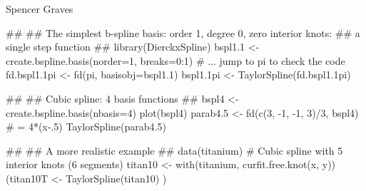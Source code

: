 \documentclass{article}
\begin{document}
\begin{Author}\relax
Spencer Graves
\end{Author}
\begin{SeeAlso}\relax
{}
\end{SeeAlso}
\begin{Examples}
\begin{ExampleCode}
##
## The simplest b-spline basis:  order 1, degree 0, zero interior knots:
##       a single step function
##
library(DierckxSpline)
bspl1.1 <- create.bspline.basis(norder=1, breaks=0:1)
# ... jump to pi to check the code
fd.bspl1.1pi <- fd(pi, basisobj=bspl1.1)
bspl1.1pi <- TaylorSpline(fd.bspl1.1pi)


##
## Cubic spline:  4  basis functions
##
bspl4 <- create.bspline.basis(nbasis=4)
plot(bspl4)
parab4.5 <- fd(c(3, -1, -1, 3)/3, bspl4)
# = 4*(x-.5)
TaylorSpline(parab4.5)

##
## A more realistic example
##
data(titanium)
#  Cubic spline with 5 interior knots (6 segments)
titan10 <- with(titanium, curfit.free.knot(x, y))
(titan10T <- TaylorSpline(titan10) )

\end{ExampleCode}
\end{Examples}
\end{document}
